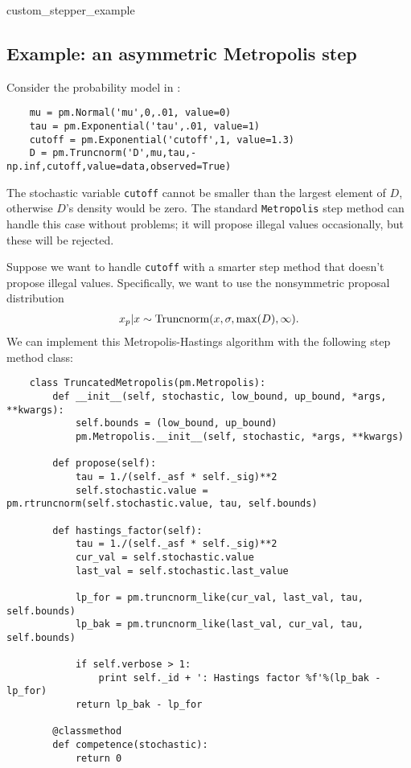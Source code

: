 \hypertarget{custom_stepper_example}{custom_stepper_example}
\subsection*{Example: an asymmetric Metropolis step} \label{user-gen}
Consider the probability model in : 
\begin{verbatim}
	mu = pm.Normal('mu',0,.01, value=0)
	tau = pm.Exponential('tau',.01, value=1)
	cutoff = pm.Exponential('cutoff',1, value=1.3)
	D = pm.Truncnorm('D',mu,tau,-np.inf,cutoff,value=data,observed=True)
\end{verbatim}
The stochastic variable \texttt{cutoff} cannot be smaller than the largest element of $D$, otherwise $D$'s density would be zero. The standard \texttt{Metropolis} step method can handle this case without problems; it will propose illegal values occasionally, but these will be rejected. 

\medskip
Suppose we want to handle \texttt{cutoff} with a smarter step method that doesn't propose illegal values. Specifically, we want to use the nonsymmetric proposal distribution
\begin{eqnarray*}
	x_p | x \sim \textup{Truncnorm}(x, \sigma, \max(D), \infty).
\end{eqnarray*}
We can implement this Metropolis-Hastings algorithm with the following step method class:
\begin{verbatim}
	class TruncatedMetropolis(pm.Metropolis):
	    def __init__(self, stochastic, low_bound, up_bound, *args, **kwargs):
	        self.bounds = (low_bound, up_bound)
	        pm.Metropolis.__init__(self, stochastic, *args, **kwargs)

	    def propose(self):
	        tau = 1./(self._asf * self._sig)**2
	        self.stochastic.value = pm.rtruncnorm(self.stochastic.value, tau, self.bounds)

	    def hastings_factor(self):
	        tau = 1./(self._asf * self._sig)**2
	        cur_val = self.stochastic.value
	        last_val = self.stochastic.last_value

	        lp_for = pm.truncnorm_like(cur_val, last_val, tau, self.bounds)
	        lp_bak = pm.truncnorm_like(last_val, cur_val, tau, self.bounds)   

	        if self.verbose > 1:
	            print self._id + ': Hastings factor %f'%(lp_bak - lp_for)     
	        return lp_bak - lp_for

	    @classmethod
	    def competence(stochastic):
	        return 0	
\end{verbatim}

